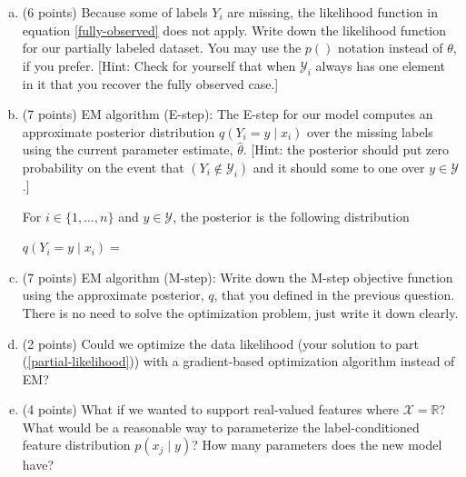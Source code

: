 \documentclass[11pt]{article}
\begin{document}
\begin{enumerate}[(a)]
\item (6 points) \label{partial-likelihood} Because some of labels $Y_i$ are missing, the
  likelihood function in equation \ref{fully-observed} does not apply.  Write
  down the likelihood function for our partially labeled dataset.  You may use
  the $p()$ notation instead of $\theta$, if you prefer. [Hint: Check for
    yourself that when $\mathcal{Y}_i$ always has one element in it that you
    recover the fully observed case.]

\begin{answertext}{1.5in}{}
\end{answertext}

\newpage
\item (7 points) EM algorithm (E-step): The E-step for our model computes an approximate
  posterior distribution $q( Y_i = y \mid x_{i})$ over the missing labels using the current parameter
  estimate, $\widehat{\theta}$. [Hint: the posterior should put zero
    probability on the event that $(Y_i \notin \mathcal{Y}_i)$ and it should
    some to one over $y \in \mathcal{Y}$.]

\vspace{10pt}
\noindent For $i \in \{1, \ldots, n\}$ and $y \in \mathcal{Y}$, the posterior is the
following distribution

\begin{answertext}{3in}{}
$q( Y_i = y \mid x_{i} ) = $\\
\end{answertext}

\item (7 points) EM algorithm (M-step): Write down the M-step objective function using the
  approximate posterior, $q$, that you defined in the previous question.  There is no need to solve
  the optimization problem, just write it down clearly.

\begin{answertext}{3in}{}
\end{answertext}

\newpage
\item (2 points) Could we optimize the data likelihood (your solution to part
  (\ref{partial-likelihood})) with a gradient-based optimization algorithm
  instead of EM?

\begin{answertext}{2in}{}
\end{answertext}

\item (4 points) What if we wanted to support real-valued features where
  $\mathcal{X} = \mathbb{R}$?  What would be a reasonable way to parameterize
  the label-conditioned feature distribution $p(x_j \mid y)$?  How many
  parameters does the new model have?

\begin{answertext}{3in}{}
\end{answertext}

\end{enumerate}
\end{document}
